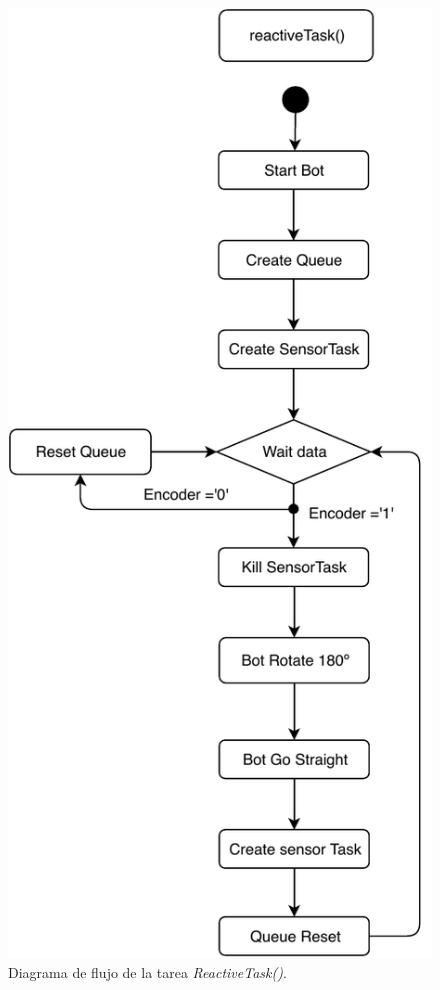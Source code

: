 \documentclass[conference]{IEEEtran}
\begin{document}
\begin{figure}[h]
    \centering
    \includegraphics[width=\linewidth]{photos/reactive.pdf}
    \caption{\large{Diagrama de flujo de la tarea \textit{ReactiveTask()}.}}
    \label{fig:reactive}
\end{figure}
\end{document}
